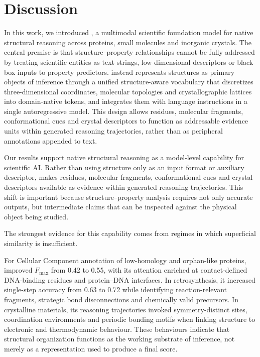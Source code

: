 
\section{Discussion}\label{sec12}
 
 

 
 

 

 
 
 

 
 
 

 
 
 
 
 

 
 
 

In this work, we introduced \projName{}, a multimodal scientific foundation model for native structural reasoning across proteins, small molecules and inorganic crystals.
The central premise is that structure--property relationships cannot be fully addressed by treating scientific entities as text strings, low-dimensional descriptors or black-box inputs to property predictors.
\projName{} instead represents structures as primary objects of inference through a unified structure-aware vocabulary that discretizes three-dimensional coordinates, molecular topologies and crystallographic lattices into domain-native tokens, and integrates them with language instructions in a single autoregressive model.
This design allows residues, molecular fragments, conformational cues and crystal descriptors to function as addressable evidence units within generated reasoning trajectories, rather than as peripheral annotations appended to text.


Our results support native structural reasoning as a model-level capability for scientific AI.
Rather than using structure only as an input format or auxiliary descriptor, \projName{} makes residues, molecular fragments, conformational cues and crystal descriptors available as evidence within generated reasoning trajectories.
This shift is important because structure--property analysis requires not only accurate outputs, but intermediate claims that can be inspected against the physical object being studied.

The strongest evidence for this capability comes from regimes in which superficial similarity is insufficient.
 
For Cellular Component annotation of low-homology and orphan-like proteins, \projName{} improved $F_{\max}$ from 0.42 to 0.55, with its attention enriched at contact-defined DNA-binding residues and protein--DNA interfaces. 
In retrosynthesis, it increased single-step accuracy from 0.63 to 0.72 while identifying reaction-relevant fragments, strategic bond disconnections and chemically valid precursors.
In crystalline materials, its reasoning trajectories invoked symmetry-distinct sites, coordination environments and periodic bonding motifs when linking structure to electronic and thermodynamic behaviour.
These behaviours indicate that structural organization functions as the working substrate of inference, not merely as a representation used to produce a final score.


